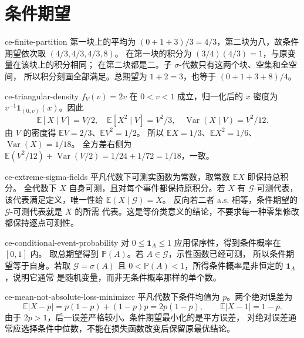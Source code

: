 \chapter{条件期望}

\begin{solution}{ce-finite-partition}
第一块上的平均为 $(0+1+3)/3=4/3$，第二块为八，故条件期望依次取
$(4/3,4/3,4/3,8)$。
在第一块的积分为 $(3/4)(4/3)=1$，与原变量在该块上的积分相同；
在第二块都是二。子 $\sigma$-代数只有这两个块、空集和全空间，
所以积分刻画全部满足。总期望为 $1+2=3$，也等于 $(0+1+3+8)/4$。
\end{solution}

\begin{solution}{ce-triangular-density}
$f_V(v)=2v$ 在 $0<v<1$ 成立，归一化后的 $x$ 密度为
$v^{-1}\mathbf1_{(0,v)}(x)$。因此
\[
 \mathbb E[X\mid V]=V/2,\quad
 \mathbb E[X^2\mid V]=V^2/3,\quad
 \operatorname{Var}(X\mid V)=V^2/12.
\]
由 $V$ 的密度得 $\mathbb EV=2/3$、$\mathbb EV^2=1/2$。
所以 $\mathbb EX=1/3$、$\mathbb EX^2=1/6$、$\operatorname{Var}(X)=1/18$。
全方差右侧为
$\mathbb E(V^2/12)+\operatorname{Var}(V/2)=1/24+1/72=1/18$，一致。
\end{solution}

\begin{solution}{ce-extreme-sigma-fields}
平凡代数下可测实函数为常数，取常数 $\mathbb EX$ 即保持总积分。
全代数下 $X$ 自身可测，且对每个事件都保持原积分。若 $X$ 有
$\mathcal G$-可测代表，该代表满足定义，唯一性给 $\mathbb E(X\mid\mathcal G)=X$。
反向若二者 a.s. 相等，条件期望的 $\mathcal G$-可测代表就是 $X$ 的所需
代表。这是等价类意义的结论，不要求每一种零集修改都保持逐点可测性。
\end{solution}

\begin{solution}{ce-conditional-event-probability}
对 $0\le\mathbf1_A\le1$ 应用保序性，得到条件概率在 $[0,1]$ 内。
取总期望得到 $\mathbb P(A)$。若 $A\in\mathcal G$，示性函数已经可测，
所以条件期望等于自身。若取 $\mathcal G=\sigma(A)$ 且
$0<\mathbb P(A)<1$，所得条件概率是非恒定的 $\mathbf1_A$，说明它通常
是随机变量，而非无条件概率那样的单个数。
\end{solution}

\begin{solution}{ce-mean-not-absolute-loss-minimizer}
平凡代数下条件均值为 $p$。两个绝对误差为
\[
 \mathbb E|X-p|=p(1-p)+(1-p)p=2p(1-p),\qquad
 \mathbb E|X-1|=1-p.
\]
由于 $2p>1$，后一误差严格较小。条件期望最小化的是平方误差，
对绝对误差通常应选择条件中位数，不能在损失函数改变后保留原最优结论。
\end{solution}

